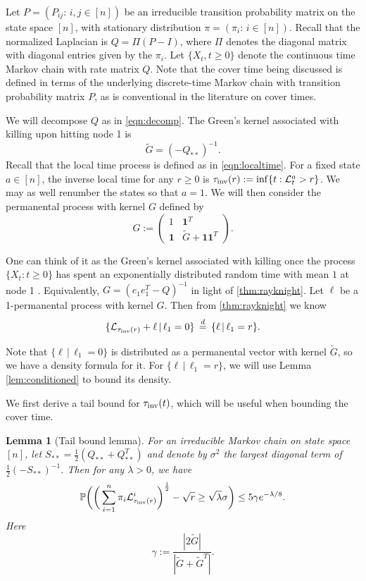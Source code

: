 \documentclass[a4paper, 11pt]{article}
\renewcommand{\P}{\mathbb{P}}
\newcommand{\allone}{\mathbf{1}}
\newcommand{\ind}{\mathbf{1}}
\newcommand{\Ell}{\mathcal{L}}
\newcommand{\inv}{\tau_\textnormal{inv}}
\newtheorem{lem}[thm]{Lemma}
\begin{document}
Let $P=(P_{ij}:\, i,j\in[n])$ be an irreducible transition probability matrix on the state space $[n]$, with stationary distribution $\pi=(\pi_i:\, i\in[n])$. Recall that the normalized Laplacian is $Q=\Pi(P-I)$, where $\Pi$ denotes the diagonal matrix with diagonal entries given by the $\pi_i$. Let $\{ X_t, t \ge 0\}$ denote the continuous time Markov chain with rate matrix $Q$. Note that the cover time being discussed is defined in terms of the underlying discrete-time Markov chain with transition probability matrix $P$, as is conventional in the literature on cover times.

We will decompose $Q$ as in \cref{eqn:decomp}. The Green's kernel associated with killing upon hitting node 1 is
\begin{equation}    \label{eq:definetildeG}
\tilde{G}=(-Q_{**})^{-1}.
\end{equation}
Recall that the local time process is defined as in
\cref{eqn:localtime}.
For a fixed state $a \in [n]$, the inverse local time for any $r\geq 0$ is $\inv(r):=\inf\{t : \Ell_t^a>r\}$. We may as well renumber the states so that $a =1$. We will then consider the permanental process with kernel $G$ defined by
\[G:=\begin{pmatrix}
1 & \allone^T\\ \allone & \tilde{G}+\allone\allone^T
\end{pmatrix}.\]

One can think of it as the Green's kernel associated with killing once the process $\{X_t: t\geq 0\}$ has spent an exponentially distributed random time with mean $1$
at node 1 \cite{ek09}.
Equivalently, $G=(e_1e_1^T-Q)^{-1}$ in light of \cref{thm:rayknight}. Let $\ell$ be a 1-permanental process with kernel $G$. Then from \cref{thm:rayknight} we know
\[\{\Ell_{\inv(r)}+\ell\,|\,\ell_1=0\}\,\stackrel{d}{=}\,\{\ell\,|\,\ell_1=r\}.\]

Note that $\{\ell\,|\,\ell_1=0\}$ is distributed as a permanental vector with kernel $\tilde{G}$, so we have a density formula for it. For $\{\ell\,|\,\ell_1=r\}$, we will use Lemma \ref{lem:conditioned} to bound its density.

We first derive a tail bound for $\inv (t)$, which will be useful when bounding the cover time.

\vspace{.3em} \begin{lem}[Tail bound lemma]
\label{lem:tail}
For an irreducible Markov chain on state space $[n]$, let $S_{**}=\frac{1}{2}(Q_{**}+Q_{**}^T)$ and denote by $\sigma^2$ the largest diagonal term of $\frac{1}{2}(-S_{**})^{-1}$. Then for any $\lambda>0$, we have
\[\P\bigg(\bigg(\sum_{i=1}^n \pi_i\Ell_{\inv(r)}^i\bigg)^{\frac{1}{2}}-\sqrt{r}\geq \sqrt{\lambda}\sigma\bigg)\leq 5\gamma e^{-\lambda/8}.\]
Here
\begin{equation}    \label{eq:definegamma}
\gamma:=\frac{|2\tilde{G}|}{|\tilde{G}+\tilde{G}^T|}.
\end{equation}
\end{lem}
\end{document}
